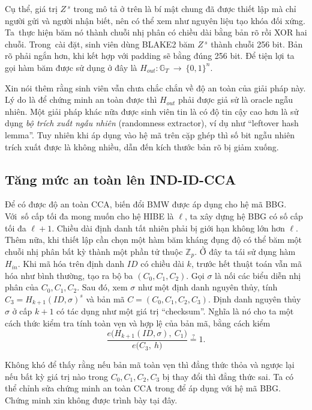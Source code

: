 \documentclass[class=report, crop=false]{standalone}
\begin{document}
			Cụ thể, giá trị $Z\,^s$ trong mô tả ở trên là bí mật chung đã được thiết lập mà chỉ người gửi và người nhận biết, nên có thể xem như nguyên liệu tạo khóa đối xứng. Ta~thực hiện băm nó thành chuỗi nhị phân có chiều dài bằng bản rõ rồi XOR hai chuỗi. Trong~cài đặt, sinh viên dùng BLAKE2 băm $Z\,^s$ thành chuỗi 256 bit. Bản rõ phải ngắn hơn, khi kết hợp với padding sẽ bằng đúng 256 bit. Để tiện lợi ta gọi hàm băm được sử dụng ở đây là $H_{out}: \mathbb{G}_T \ \rightarrow \ \{0, 1 \}^n$.
			
			Xin nói thêm rằng sinh viên vẫn chưa chắc chắn về độ an toàn của giải pháp này. Lý do là để chứng minh an toàn được thì $H_{out}$ phải được giả sử là oracle ngẫu nhiên. Một giải pháp khác nữa được sinh viên tin là có độ tin cậy cao hơn là sử dụng \textit{bộ trích xuất ngẫu nhiên} (randomness extractor), ví dụ như ``leftover hash lemma''. Tuy nhiên khi áp dụng vào hệ mã trên cặp ghép thì số bit ngẫu nhiên trích xuất được là không nhiều, dẫn đến kích thước bản rõ bị giảm xuống.
		\subsection{Tăng mức an toàn lên IND-ID-CCA}
			Để có được độ an toàn CCA, biến đổi BMW được áp dụng cho hệ mã BBG. Với~số cấp tối đa mong muốn cho hệ HIBE là $\ell$, ta xây dựng hệ BBG có số cấp tối đa $\ell + 1$. Chiều dài định danh tất nhiên phải bị giới hạn không lớn hơn $\ell$. Thêm nữa, khi thiết lập cần chọn một hàm băm kháng đụng độ có thể băm một chuỗi nhị phân bất kỳ thành một phần tử thuộc $\mathbb{Z}_p$. Ở đây ta tái sử dụng hàm $H_{in}$. Khi mã hóa trên định danh $ID$ có chiều dài $k$, trước hết thuật toán vẫn mã hóa như bình thường, tạo ra bộ ba $(C_0, C_1, C_2)$. Gọi $\sigma$ là nối các biểu diễn nhị phân của $C_0, C_1, C_2$. Sau đó, xem $\sigma$ như một định danh nguyên thủy, tính $C_3 = H_{k + 1}(ID, \sigma)^s$ và bản mã $C = (C_0, C_1, C_2, C_3)$.
			\newpage
			Định danh nguyên thủy $\sigma$ ở cấp $k + 1$ có tác dụng như một giá trị ``checksum''. Nghĩa là nó cho ta một cách thức kiểm tra tính toàn vẹn và hợp lệ của bản mã, bằng cách kiểm
			\[
				\frac{e \Big(H_{k + 1}(ID, \sigma),\ C_1 \Big)}{e \Big(C_3,\ h \Big)} \overset{?}{=} 1.
			\]
			
			Không khó để thấy rằng nếu bản mã toàn vẹn thì đẳng thức thỏa và ngược lại nếu bất kỳ giá trị nào trong $C_0, C_1, C_2, C_3$ bị thay đổi thì đẳng thức sai. Ta có thể chỉnh sửa chứng minh an toàn CCA trong \cite{DBLP:conf/ccs/BoyenMW05} để áp dụng với hệ mã BBG. Chứng minh xin không được trình bày tại đây.
\end{document}
